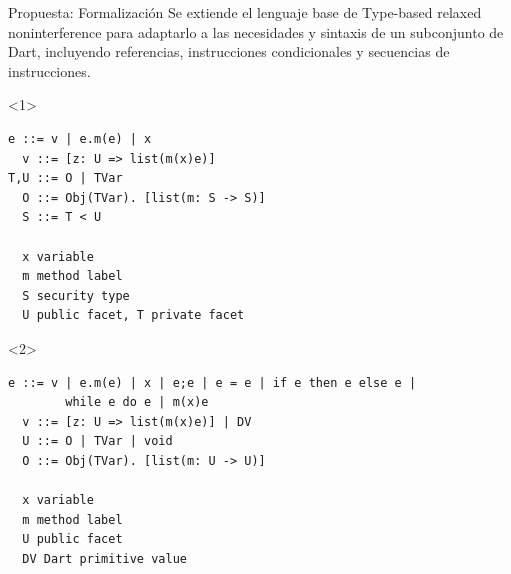 \documentclass[aspectratio=169,10pt]{beamer}
\begin{document}
\begin{frame}[fragile]{Propuesta: Formalización}
  Se extiende el lenguaje base de Type-based relaxed noninterference para adaptarlo a las necesidades y sintaxis de un subconjunto de Dart, incluyendo referencias, instrucciones condicionales y secuencias de instrucciones.
  \begin{onlyenv}<1>
    \begin{Verbatim}[fontsize=\small]
  e ::= v | e.m(e) | x
  v ::= [z: U => list(m(x)e)]
T,U ::= O | TVar
  O ::= Obj(TVar). [list(m: S -> S)]
  S ::= T < U

  x variable
  m method label
  S security type
  U public facet, T private facet
\end{Verbatim}
  \end{onlyenv}
    \begin{onlyenv}<2>
    \begin{Verbatim}[fontsize=\small]
  e ::= v | e.m(e) | x | e;e | e = e | if e then e else e |
        while e do e | m(x)e
  v ::= [z: U => list(m(x)e)] | DV
  U ::= O | TVar | void
  O ::= Obj(TVar). [list(m: U -> U)]

  x variable
  m method label
  U public facet
  DV Dart primitive value
\end{Verbatim}
  \end{onlyenv}
\end{frame}
\end{document}
